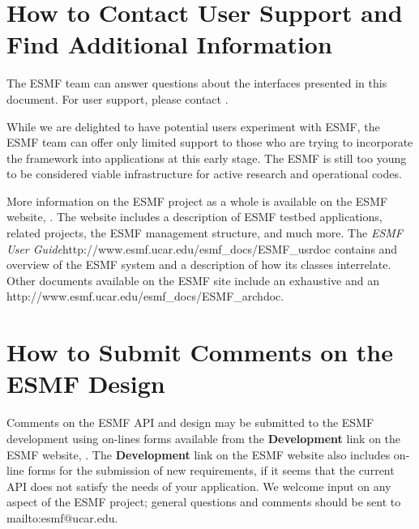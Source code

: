 \section{How to Contact User Support and Find Additional Information}
\label{sec:Support}
The ESMF team can answer questions about the interfaces presented in this 
document.  For user support, please contact 
.  

While we are delighted to have potential users experiment with ESMF, the
ESMF team can offer only limited support to those who are trying to incorporate 
the framework into applications at this early stage.  The ESMF is still
too young to be considered viable infrastructure for active research and 
operational codes.  

More information on the ESMF project as a whole is available on the 
ESMF website, .  
The website includes a description of ESMF testbed applications, related projects,
the ESMF management structure, and much more.  The \htmladdnormallink
{{\it ESMF User Guide}}{http://www.esmf.ucar.edu/esmf_docs/ESMF_usrdoc} contains 
and overview of the ESMF system and a description of how its classes interrelate.
Other documents available on the ESMF site include an exhaustive
and an 
{http://www.esmf.ucar.edu/esmf_docs/ESMF_archdoc}.

\section{How to Submit Comments on the ESMF Design}
\label{sec:Submission}
Comments on the ESMF API and design may be submitted to the ESMF development 
using on-lines forms available from the {\bf Development} link on the ESMF 
website, .  
The {\bf Development} 
link on the ESMF website also includes on-line forms for the submission of 
new requirements, if it seems that the current API does not satisfy the needs of 
your application.  We welcome input on any aspect of the ESMF project; general
questions and comments should be sent to 
{mailto:esmf@ucar.edu}.






